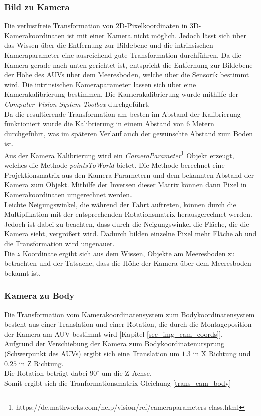 \subsubsection{Bild zu Kamera}
\label{section_PicToCam}
Die verlustfreie Transformation von 2D-Pixelkoordinaten in 3D-Kamerakoordinaten ist mit einer Kamera nicht möglich. Jedoch lässt sich über das Wissen über die Entfernung zur Bildebene und die intrinsischen Kameraparameter eine ausreichend gute Transformation durchführen. Da die Kamera gerade nach unten gerichtet ist, entspricht die Entfernung zur Bildebene der Höhe des AUVs über dem Meeresboden, welche über die Sensorik bestimmt wird. Die intrinsischen Kameraparameter lassen sich über eine Kamerakalibrierung bestimmen. Die Kamerakalibrierung wurde mithilfe der \matlab \textit{Computer Vision System Toolbox} durchgeführt.\\
Da die resultierende Transformation am besten im Abstand der Kalibrierung funktioniert wurde die Kalibrierung in einem Abstand von 6 Metern durchgeführt, was im späteren Verlauf auch der gewünschte Abstand zum Boden ist.\\
Aus der Kamera Kalibrierung wird ein \textit{CameraParameter}\footnote{https://de.mathworks.com/help/vision/ref/cameraparameters-class.html} Objekt erzeugt, welches die Methode \textit{pointsToWorld} bietet. Die Methode berechnet eine Projektionsmatrix aus den Kamera-Parametern und dem bekannten Abstand der Kamera zum Objekt. Mithilfe der Inversen dieser Matrix können dann Pixel in Kamerakoordinaten umgerechnet werden.\\
Leichte Neigungswinkel, die während der Fahrt auftreten, können durch die Multiplikation mit der entsprechenden Rotationsmatrix herausgerechnet werden. Jedoch ist dabei zu beachten, dass durch die Neigungswinkel die Fläche, die die Kamera sieht, vergrößert wird. Dadurch bilden einzelne Pixel mehr Fläche ab und die Transformation wird ungenauer.\\
Die $z$ Koordinate ergibt sich aus dem Wissen, Objekte am Meeresboden zu betrachten und der Tatsache, dass die Höhe der Kamera über dem Meeresboden bekannt ist.

\subsubsection{Kamera zu Body}
Die Transformation vom Kamerakoordinatensystem zum Bodykoordinatensystem besteht aus einer Translation und einer Rotation, die durch die Montageposition der Kamera am AUV bestimmt wird [Kapitel \ref{sec_img_cam_coords}].\\
Aufgrund der Verschiebung der Kamera zum Bodykoordinatenursprung (Schwerpunkt des AUVs) ergibt sich eine Translation um $1.3$ in X Richtung und $0.25$ in Z Richtung.\\
Die Rotation beträgt dabei $90^\circ$ um die Z-Achse.\\
Somit ergibt sich die Tranformationsmatrix Gleichung \ref{trans_cam_body}\\

